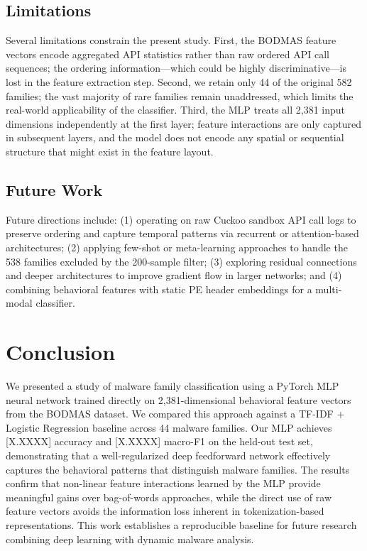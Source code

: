 \documentclass[11pt]{article}
\begin{document}
\subsection{Limitations}

Several limitations constrain the present study. First, the BODMAS
feature vectors encode aggregated API statistics rather than raw
ordered API call sequences; the ordering information—which could be
highly discriminative—is lost in the feature extraction step. Second,
we retain only 44 of the original 582 families; the vast majority of
rare families remain unaddressed, which limits the real-world
applicability of the classifier. Third, the MLP treats all 2,381 input
dimensions independently at the first layer; feature interactions are
only captured in subsequent layers, and the model does not encode any
spatial or sequential structure that might exist in the feature layout.

\subsection{Future Work}

Future directions include: (1) operating on raw Cuckoo sandbox API
call logs to preserve ordering and capture temporal patterns via
recurrent or attention-based architectures; (2) applying few-shot or
meta-learning approaches to handle the 538 families excluded by the
200-sample filter; (3) exploring residual connections and deeper
architectures to improve gradient flow in larger networks; and
(4) combining behavioral features with static PE header embeddings for
a multi-modal classifier.

\section{Conclusion}
\label{sec:conclusion}

We presented a study of malware family classification using a PyTorch
MLP neural network trained directly on 2,381-dimensional behavioral
feature vectors from the BODMAS dataset. We compared this approach
against a TF-IDF + Logistic Regression baseline across 44 malware
families. Our MLP achieves [X.XXXX] accuracy and [X.XXXX] macro-F1
on the held-out test set, demonstrating that a well-regularized deep
feedforward network effectively captures the behavioral patterns that
distinguish malware families. The results confirm that non-linear
feature interactions learned by the MLP provide meaningful gains over
bag-of-words approaches, while the direct use of raw feature vectors
avoids the information loss inherent in tokenization-based
representations. This work establishes a reproducible baseline for
future research combining deep learning with dynamic malware analysis.
\end{document}
